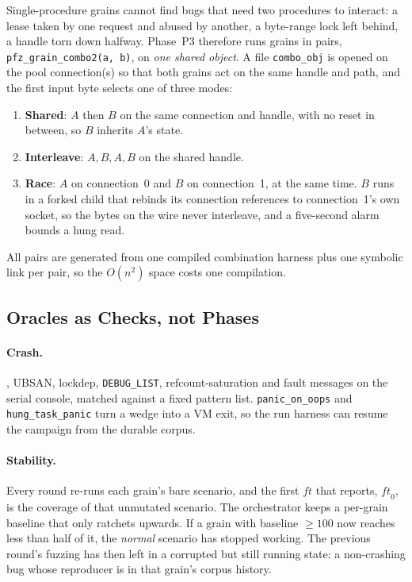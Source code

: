 \documentclass{article}
\begin{document}
Single-procedure grains cannot find bugs that need two procedures to
interact: a lease taken by one request and abused by another, a byte-range
lock left behind, a handle torn down halfway. Phase~P3 therefore runs grains
in pairs, \texttt{pfz\_grain\_combo2(a, b)}, on \emph{one shared object}. A
file \texttt{combo\_obj} is opened on the pool connection(s) so that both
grains act on the same handle and path, and the first input byte selects one
of three modes:
\begin{enumerate}[nosep]
  \item \textbf{Shared}: $A$ then $B$ on the same connection and handle, with
        no reset in between, so $B$ inherits $A$'s state.
  \item \textbf{Interleave}: $A, B, A, B$ on the shared handle.
  \item \textbf{Race}: $A$ on connection~0 and $B$ on connection~1, at the
        same time. $B$ runs in a forked child that rebinds its connection
        references to connection~1's own socket, so the bytes on the wire
        never interleave, and a five-second alarm bounds a hung read.
\end{enumerate}
All pairs are generated from one compiled combination harness plus one
symbolic link per pair, so the $O(n^2)$ space costs one compilation.

\subsection{Oracles as Checks, not Phases}\label{sec:oracles}

\paragraph{Crash.} \kasan, UBSAN, lockdep, \texttt{DEBUG\_LIST},
refcount-saturation and fault messages on the serial console, matched against
a fixed pattern list. \texttt{panic\_on\_oops} and \texttt{hung\_task\_panic}
turn a wedge into a VM exit, so the run harness can resume the campaign from
the durable corpus.

\paragraph{Stability.} Every round re-runs each grain's bare scenario, and the
first $\mathit{ft}$ that \libfuzzer reports, $\mathit{ft}_0$, is the coverage
of that unmutated scenario. The orchestrator keeps a per-grain baseline that
only ratchets upwards. If a grain with baseline $\geq 100$ now reaches less
than half of it, the \emph{normal} scenario has stopped working. The previous
round's fuzzing has then left \ksmbd in a corrupted but still running state:
a non-crashing bug whose reproducer is in that grain's corpus history.
\end{document}
